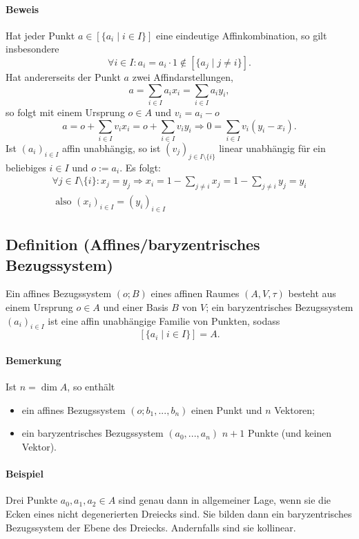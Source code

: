 \paragraph{Beweis}
	Hat jeder Punkt $ a\in [\{a_i\mid i\in I\}] $ eine eindeutige Affinkombination, so gilt insbesondere
		\[ \forall i\in I: a_i = a_i\cdot 1 \notin [\{a_j\mid j\neq i\}]. \]
	Hat andererseits der Punkt $ a $ zwei Affindarstellungen,
		\[ a = \sum_{i\in I} a_ix_i = \sum_{i\in I}a_iy_i, \]
	so folgt mit einem Ursprung $ o\in A $ und $ v_i = a_i-o $
		\[ a=o+\sum_{i\in I}v_ix_i=o+\sum_{i\in I}v_iy_i \Rightarrow 0 = \sum_{i\in I}v_i(y_i-x_i). \]
	Ist $ (a_i)_{i\in I} $ affin unabhängig, so ist $ (v_j)_{j\in I\setminus \{i\}} $ linear unabhängig für ein beliebiges $ i\in I $ und $ o:= a_i $. Es folgt:
	\begin{gather*}
        \forall j\in I\setminus \{i\}:x_j=y_j \Rightarrow x_i = 1-\sum_{j\neq i}x_j = 1-\sum_{j\neq i}y_j = y_i 
        \\ \text{ also } (x_{i})_{i \in I} = (y_{i})_{i \in I}
	\end{gather*}

\subsection{Definition (Affines/baryzentrisches Bezugssystem)}
	\begin{Definition}
	Ein affines Bezugssystem $ (o;B) $ eines affinen Raumes $ (A,V,\tau) $ besteht aus einem Ursprung $ o\in A $ und einer Basis $ B $ von $ V $;
	ein baryzentrisches Bezugssystem $ (a_i)_{i\in I} $ ist eine affin unabhängige Familie von Punkten, sodass 
		\[ [\{a_i\mid {i\in I}\}] = A. \]
	\end{Definition}
	
\paragraph{Bemerkung}
	Ist $ n=\dim A $, so enthält
		\begin{itemize}
		\item ein affines Bezugssystem $ (o;b_1,...,b_n) $ einen Punkt und $ n $ Vektoren;
		\item ein baryzentrisches Bezugssystem $ (a_0,...,a_n) $ $ n+1 $ Punkte (und keinen Vektor).
		\end{itemize}
		
\paragraph{Beispiel}
	Drei Punkte $ a_0,a_1,a_2 \in A $ sind genau dann in allgemeiner Lage, wenn sie die Ecken eines nicht degenerierten Dreiecks sind. Sie bilden dann ein baryzentrisches Bezugssystem der Ebene des Dreiecks. Andernfalls sind sie kollinear.
	
